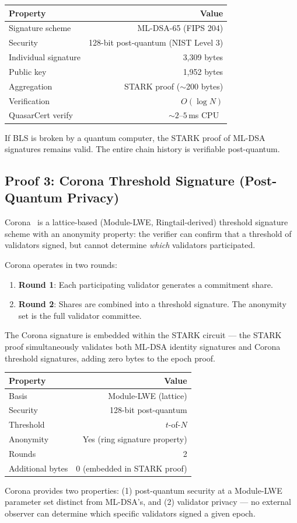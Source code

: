 \begin{center}
\begin{tabular}{lr}
\toprule
\textbf{Property} & \textbf{Value} \\
\midrule
Signature scheme & ML-DSA-65 (FIPS 204) \\
Security & 128-bit post-quantum (NIST Level 3) \\
Individual signature & 3,309 bytes \\
Public key & 1,952 bytes \\
Aggregation & STARK proof ($\sim$200 bytes) \\
Verification & $O(\log N)$ \\
QuasarCert verify & ${\sim}2$--$5$\,ms CPU~\cite{lux-benchmarks} \\
\bottomrule
\end{tabular}
\end{center}

If BLS is broken by a quantum computer, the STARK proof of ML-DSA signatures remains valid. The entire chain history is verifiable post-quantum.

\subsection{Proof 3: Corona Threshold Signature (Post-Quantum Privacy)}

Corona~\cite{lux-corona} is a lattice-based (Module-LWE, Ringtail-derived) threshold signature scheme with an anonymity property: the verifier can confirm that a threshold of validators signed, but cannot determine \textit{which} validators participated.

Corona operates in two rounds:

\begin{enumerate}[leftmargin=2em]
\item \textbf{Round 1}: Each participating validator generates a commitment share.
\item \textbf{Round 2}: Shares are combined into a threshold signature. The anonymity set is the full validator committee.
\end{enumerate}

The Corona signature is embedded within the STARK circuit --- the STARK proof simultaneously validates both ML-DSA identity signatures and Corona threshold signatures, adding zero bytes to the epoch proof.

\begin{center}
\begin{tabular}{lr}
\toprule
\textbf{Property} & \textbf{Value} \\
\midrule
Basis & Module-LWE (lattice) \\
Security & 128-bit post-quantum \\
Threshold & $t$-of-$N$ \\
Anonymity & Yes (ring signature property) \\
Rounds & 2 \\
Additional bytes & 0 (embedded in STARK proof) \\
\bottomrule
\end{tabular}
\end{center}

Corona provides two properties: (1) post-quantum security at a Module-LWE parameter set distinct from ML-DSA's, and (2) validator privacy --- no external observer can determine which specific validators signed a given epoch.

